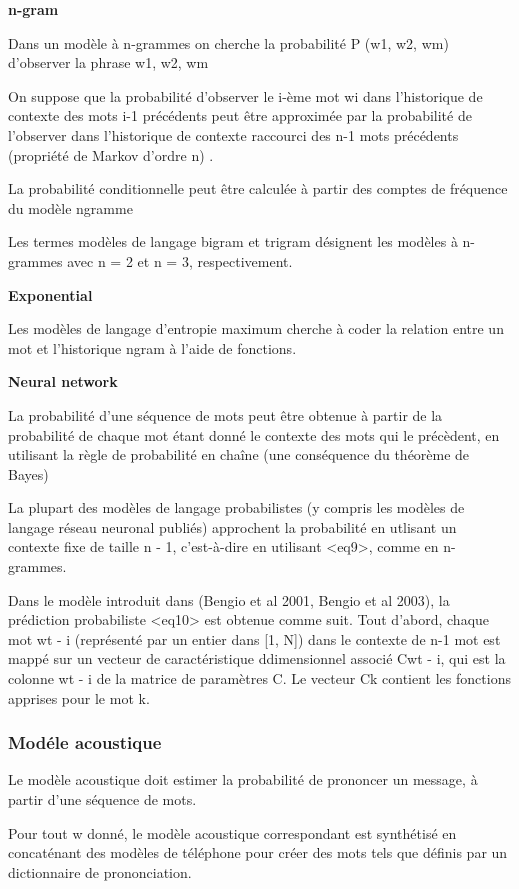 \documentclass[a4paper, 12pt]{book}
\begin{document}
\textbf{n-gram}

Dans un modèle à n-grammes on cherche la probabilité P (w1, w2, wm) d'observer la phrase w1, w2, wm

On suppose que la probabilité d'observer le i-ème mot wi dans l'historique de contexte des mots i-1 précédents peut être approximée par la probabilité de l'observer dans l'historique de contexte raccourci des n-1 mots précédents (propriété de Markov d'ordre n) .

La probabilité conditionnelle peut être calculée à partir des comptes de fréquence du modèle ngramme


Les termes modèles de langage bigram et trigram désignent les modèles à n-grammes avec n = 2 et n = 3, respectivement.

\textbf{Exponential}

Les modèles de langage d'entropie maximum cherche à coder la relation entre un mot et l'historique ngram à l'aide de fonctions.

\textbf{Neural network}

La probabilité d'une séquence de mots peut être obtenue à partir de la probabilité de chaque mot étant donné le contexte des mots qui le précèdent, en utilisant la règle de probabilité en chaîne (une conséquence du théorème de Bayes)

La plupart des modèles de langage probabilistes (y compris les modèles de langage réseau neuronal publiés) approchent la probabilité en utlisant un contexte fixe de taille n - 1, c'est-à-dire en utilisant <eq9>, comme en n-grammes.

Dans le modèle introduit dans (Bengio et al 2001, Bengio et al 2003), la prédiction probabiliste <eq10> est obtenue comme suit. Tout d'abord, chaque mot wt - i (représenté par un entier dans [1, N]) dans le contexte de n-1 mot est mappé sur un vecteur de caractéristique ddimensionnel associé Cwt - i, qui est la colonne wt - i de la matrice de paramètres C. Le vecteur Ck contient les fonctions apprises pour le mot k. 



\subsubsection{Modéle acoustique}

Le modèle acoustique doit estimer la probabilité de prononcer un message, à partir d'une séquence de mots.

Pour tout w donné, le modèle acoustique correspondant est synthétisé en concaténant des modèles de téléphone pour créer des mots tels que définis par un dictionnaire de prononciation.
\end{document}
